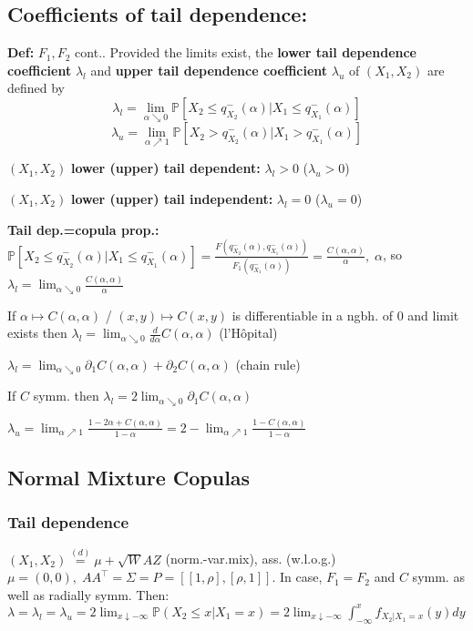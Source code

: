 \subsection*{Coefficients of tail dependence:}
\textbf{Def:} $F_1,F_2$ cont.. Provided the limits exist, the \textbf{lower tail dependence coefficient} $\lambda_l$ and \textbf{upper tail dependence coefficient} $\lambda_u$ of $(X_1,X_2)$ are defined by
\[\lambda_l=\lim_{\alpha\searrow0}\mathbb{P}[X_2\leq q_{X_2}^-(\alpha)|X_1\leq q_{X_1}^-(\alpha)] \]
\[ \lambda_u=\lim_{\alpha\nearrow1}\mathbb{P}[X_2>q_{X_2}^-(\alpha)|X_1> q_{X_1}^-(\alpha)] \]

$(X_1,X_2)$ \textbf{lower (upper) tail dependent:} $\lambda_l>0$ ($\lambda_u>0$)

$(X_1,X_2)$ \textbf{lower (upper) tail independent:} $\lambda_l=0$ ($\lambda_u=0$)

\textbf{Tail dep.=copula prop.:}
$\mathbb{P}[X_2\leq q_{X_2}^-(\alpha)|X_1\leq q_{X_1}^-(\alpha)]=\frac{F(q_{X_2}^-(\alpha), q_{X_1}^-(\alpha))}{F_1(q_{X_1}^-(\alpha))}=\frac{C(\alpha,\alpha)}{\alpha},\; \alpha$, so $\lambda_l=\lim_{\alpha\searrow 0} \frac{C(\alpha,\alpha)}{\alpha}$

If $\alpha\mapsto C(\alpha,\alpha)$ / $(x,y)\mapsto C(x,y)$ is differentiable in a ngbh. of $0$ and limit exists then $\lambda_l=\lim_{\alpha\searrow 0} \frac{d}{d\alpha}C(\alpha,\alpha)$ (l'Hôpital)

$\lambda_l=\lim_{\alpha\searrow 0} \partial_1 C(\alpha,\alpha) + \partial_2 C(\alpha,\alpha)$ (chain rule)

If $C$ symm. then $\lambda_l= 2 \lim_{\alpha\searrow 0} \partial_1 C(\alpha,\alpha)$

$\lambda_u=\lim_{\alpha\nearrow 1} \frac{1-2\alpha+C(\alpha,\alpha)}{1-\alpha}=2-\lim_{\alpha\nearrow 1} \frac{1-C(\alpha,\alpha)}{1-\alpha}$ 

\subsection*{Normal Mixture Copulas}
\subsubsection*{Tail dependence}
$(X_1,X_2)\stackrel{(d)}{=}\mu+\sqrt{W}AZ$ (norm.-var.mix), ass. (w.l.o.g.) $\mu=(0,0),\; AA^\top=\Sigma=P=[[1,\rho],[\rho,1]]$.
In case, $F_1=F_2$ and $C$ symm. as well as radially symm. Then:
$\lambda=\lambda_l=\lambda_u=2\lim_{x \downarrow -\infty}\mathbb{P}(X_2\leq x|X_1=x)=2\lim_{x\downarrow -\infty}\int^x_{-\infty} f_{X_2|X_1=x}(y)dy$


